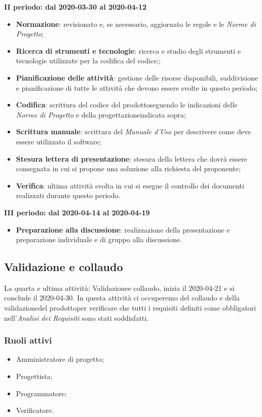 \textbf{II periodo: dal 2020-03-30 al 2020-04-12}
\begin{itemize}
	\item \textbf{Normazione}: revisionato e, se necessario, aggiornato le regole e le \textit{Norme di Progetto};
	\item \textbf{Ricerca di strumenti e tecnologie}: ricerca e studio degli strumenti e tecnologie utilizzate per la codifica del codice;;
	\item \textbf{Pianificazione delle attività}: gestione delle risorse disponibili, suddivisione e pianificazione di tutte le attività che devono essere svolte in questo periodo;
	\item \textbf{Codifica}: scrittura del codice del prodotto\glosp seguendo le indicazioni delle \textit{Norme di Progetto} e della progettazione\glosp indicata sopra;
	\item \textbf{Scrittura manuale}: scrittura del \textit{Manuale d'Uso} per descrivere come deve essere utilizzato il software;
	\item \textbf{Stesura lettera di presentazione}: stesura della lettera che dovrà essere consegnata in cui si propone una soluzione alla richiesta del proponente;
	\item \textbf{Verifica}: ultima attività svolta in cui si esegue il controllo dei documenti realizzati durante questo periodo.
\end{itemize}

\textbf{III periodo: dal 2020-04-14 al 2020-04-19}
\begin{itemize}
	\item \textbf{Preparazione alla discussione}: realizzazione della presentazione e preparazione individuale e di gruppo alla discussione.
\end{itemize}

\subsection{Validazione e collaudo}
La quarta e ultima attività: Validazione\glosp e collaudo, inizia il 2020-04-21 e si conclude il 2020-04-30. In questa attività ci occuperemo del collaudo e della validazione\glosp del prodotto\glosp per verificare che tutti i requisiti definiti come obbligatori nell'\textit{Analisi dei Requisiti} sono stati soddisfatti.

\subsubsection{Ruoli attivi}
\begin{itemize}
	\item Amministratore di progetto\glo;
	\item Progettista;
	\item Programmatore;
	\item Verificatore.
\end{itemize}

